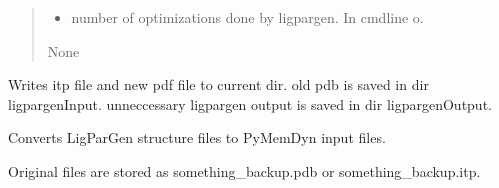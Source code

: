 \documentclass[letterpaper,10pt,english]{sphinxmanual}
\begin{document}
\begin{fulllineitems}
\begin{fulllineitems}
\begin{quote}
\begin{description}
\begin{itemize}
\item {} 
\sphinxAtStartPar
{} \textendash{} number of optimizations done by ligpargen. In cmdline \sphinxhyphen{}o.

\end{itemize}

\sphinxAtStartPar
None

\end{description}\end{quote}

\sphinxAtStartPar
Writes itp file and new pdf file to current dir. old pdb is saved in dir ligpargenInput. 
unneccessary ligpargen output is saved in dir ligpargenOutput.

\end{fulllineitems}


\begin{fulllineitems}
\label{\detokenize{protein:protein.CalculateLigandParameters.add_h}}
\pysigstartsignatures
{}
\pysigstopsignatures
\end{fulllineitems}


\begin{fulllineitems}
\label{\detokenize{protein:protein.CalculateLigandParameters.lpg2pmd}}
\pysigstartsignatures
{}
\pysigstopsignatures
\sphinxAtStartPar
Converts LigParGen structure files to PyMemDyn input files.

\sphinxAtStartPar
Original files are stored as something\_backup.pdb or something\_backup.itp.

\end{fulllineitems}


\end{fulllineitems}

\end{document}
